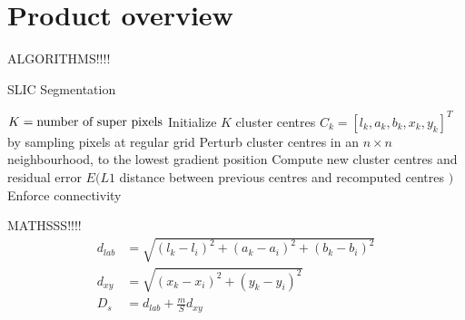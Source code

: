\section{Product overview}

ALGORITHMS!!!!
\begin{algorithm}[t]
\caption{SLIC Segmentation}
\label{alg:slic}
\begin{algorithmic}[1]
\REQUIRE $K=\textmd{number of super pixels}$
\STATE Initialize $K$ cluster centres $C_k = [l_k, a_k, b_k, x_k, y_k]^T$ by sampling pixels at regular grid
\STATE Perturb cluster centres in an $n\times n$ neighbourhood, to the lowest gradient position
\REPEAT 
{}
\ENDFOR
\STATE Compute new cluster centres and residual error $E(L1 $ distance between previous centres and recomputed centres $)$
\STATE Enforce connectivity
\end{algorithmic}
\end{algorithm}


MATHSSS!!!!
\begin{align}\label{eq:distanceSLIC}
\nonumber d_{lab} &=  \sqrt{(l_k-l_i)^2 + (a_k-a_i)^2 + (b_k-b_i)^2}\\
\nonumber d_{xy}  &=  \sqrt{(x_k-x_i)^2 + (y_k-y_i)^2 }\\
D_{s}   &= d_{lab} + \frac{m}{S} d_{xy}
\end{align}

